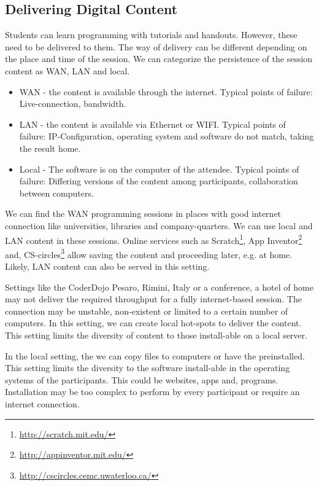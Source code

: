 \subsection{Delivering Digital Content}
Students can learn programming with tutorials and handouts.
However, these need to be delivered to them.
The way of delivery can be different depending on the place and time of the session.
We can categorize the persistence of the session content as WAN, LAN and local.

\begin{itemize}
  \item WAN - the content is available through the internet. Typical points of failure: Live-connection, bandwidth.
  \item LAN - the content is available via Ethernet or WIFI. Typical points of failure: IP-Configuration, operating system and software do not match, taking the result home.
  \item Local - The software is on the computer of the attendee. Typical points of failure: Differing versions of the content among participants, collaboration between computers.
\end{itemize}

We can find the WAN programming sessions in places with good internet connection like universities, libraries and company-quarters.
We can use local and LAN content in these sessions.
Online services such as Scratch\footnote{\url{http://scratch.mit.edu/}},
App Inventor\footnote{\url{http://appinventor.mit.edu/}} and,
CS-circles\footnote{\url{http://cscircles.cemc.uwaterloo.ca/}}
allow saving the content and proceeding later, e.g. at home.
Likely, LAN content can also be served in this setting.

Settings like the CoderDojo Pesaro, Rimini, Italy or a conference, a hotel of home may not deliver the required throughput for a fully internet-based session.
The connection may be unstable, non-existent or limited to a certain number of computers.
In this setting, we can create local hot-spots to deliver the content.
This setting limits the diversity of content to those install-able on a local server.

In the local setting, the we can copy files to computers or have the preinstalled.
This setting limits the diversity to the software install-able in the operating systems of the participants. This could be websites, apps and, programs. Installation may be too complex to perform by every participant or require an internet connection.

